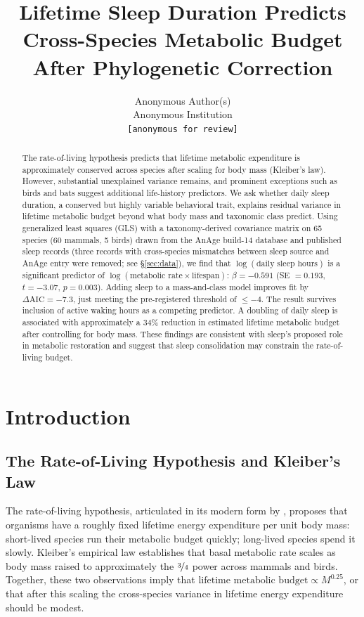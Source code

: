 \documentclass{article}
\title{Lifetime Sleep Duration Predicts Cross-Species Metabolic Budget\\
After Phylogenetic Correction}
\author{Anonymous Author(s) \\ Anonymous Institution \\ \texttt{[anonymous for review]}}
\begin{document}
\maketitle

\begin{abstract}
The rate-of-living hypothesis predicts that lifetime metabolic expenditure is approximately
conserved across species after scaling for body mass (Kleiber's law). However, substantial
unexplained variance remains, and prominent exceptions such as birds and bats suggest
additional life-history predictors. We ask whether daily sleep duration, a conserved but
highly variable behavioral trait, explains residual variance in lifetime metabolic budget
beyond what body mass and taxonomic class predict. Using generalized least squares (GLS)
with a taxonomy-derived covariance matrix on 65 species (60 mammals, 5 birds) drawn from
the AnAge build-14 database and published sleep records (three records with cross-species
mismatches between sleep source and AnAge entry were removed; see \S\ref{sec:data}), we find that
$\log(\text{daily sleep hours})$ is a significant predictor of
$\log(\text{metabolic rate} \times \text{lifespan})$: $\beta = -0.591$ (SE $= 0.193$,
$t = -3.07$, $p = 0.003$). Adding sleep to a mass-and-class model improves fit by
$\Delta\text{AIC} = -7.3$, just meeting the pre-registered threshold of $\leq -4$.
The result survives inclusion of active waking hours as a competing predictor.
A doubling of daily sleep is associated with approximately a
34\% reduction in estimated lifetime metabolic budget after controlling for body mass.
These findings are consistent with sleep's proposed role in metabolic restoration and
suggest that sleep consolidation may constrain the rate-of-living budget.
\end{abstract}


\section{Introduction}
\label{sec:intro}

\subsection{The Rate-of-Living Hypothesis and Kleiber's Law}

The rate-of-living hypothesis, articulated in its modern form by \citet{rubner1908},
proposes that organisms have a roughly fixed lifetime energy expenditure per unit
body mass: short-lived species run their metabolic budget quickly; long-lived species
spend it slowly. Kleiber's empirical law \citep{kleiber1932} establishes that basal
metabolic rate scales as body mass raised to approximately the $\nicefrac{3}{4}$ power
across mammals and birds. Together, these two observations imply that
$\text{lifetime metabolic budget} \propto M^{0.25}$, or that after this scaling the
cross-species variance in lifetime energy expenditure should be modest.
\end{document}
